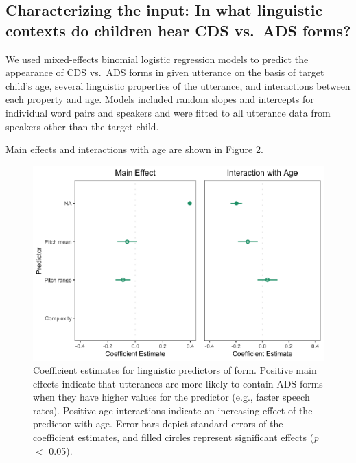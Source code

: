 \documentclass[10pt, letterpaper]{article}
\newenvironment{CodeChunk}{}{}
\begin{document}
\hypertarget{characterizing-the-input-in-what-linguistic-contexts-do-children-hear-cds-vs.-ads-forms}{%
\subsection{Characterizing the input: In what linguistic contexts do
children hear CDS vs.~ADS
forms?}\label{characterizing-the-input-in-what-linguistic-contexts-do-children-hear-cds-vs.-ads-forms}}

We used mixed-effects binomial logistic regression models to predict the
appearance of CDS vs.~ADS forms in given utterance on the basis of
target child's age, several linguistic properties of the utterance, and
interactions between each property and age. Models included random
slopes and intercepts for individual word pairs and speakers and were
fitted to all utterance data from speakers other than the target child.

Main effects and interactions with age are shown in Figure 2.

\begin{CodeChunk}
\begin{figure}[h]

{\centering \includegraphics{figs/model-plot-1} 

}

\caption[Coefficient estimates for linguistic predictors of form]{Coefficient estimates for linguistic predictors of form. Positive main effects indicate that utterances are more likely to contain ADS forms when they have higher values for the predictor (e.g., faster speech rates). Positive age interactions indicate an increasing effect of the predictor with age. Error bars depict standard errors of the coefficient estimates, and filled circles represent significant effects (\textit{p} $<$ 0.05).}\label{fig:model-plot}
\end{figure}
\end{CodeChunk}
\end{document}
